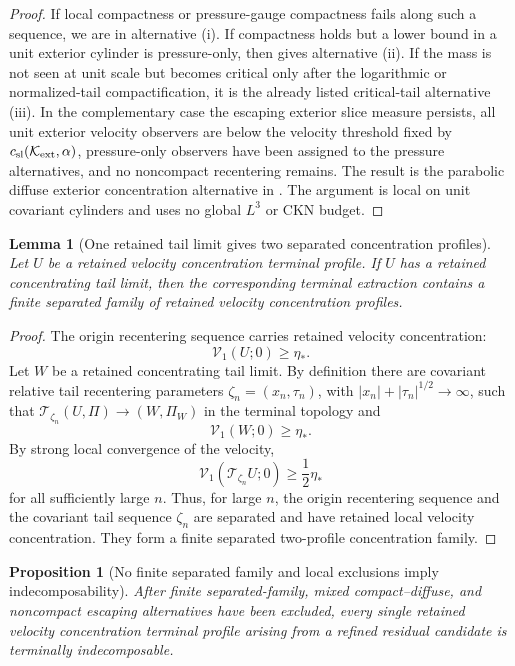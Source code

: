 \documentclass[11pt]{amsart}
\numberwithin{equation}{section}
\theoremstyle{plain}
\newtheorem{proposition}[proposition]{Proposition}
\newtheorem{lemma}[lemma]{Lemma}
\theoremstyle{definition}
\theoremstyle{remark}
\newcommand{\Vel}{\mathcal V}
\newcommand{\calK}{\mathcal K}
\begin{document}
\begin{proof}
If local compactness or pressure-gauge compactness fails along such a sequence,
we are in alternative \textup{(i)}.  If compactness holds but a lower bound in a
unit exterior cylinder is pressure-only, then
 gives alternative \textup{(ii)}.
If the mass is not seen at unit scale but becomes critical only after the
logarithmic or normalized-tail compactification, it is the already
listed critical-tail alternative \textup{(iii)}.  In the complementary case the
escaping exterior slice measure persists, all unit exterior velocity observers are
below the velocity threshold fixed by \(c_{\rm sl}(\calK_{\rm ext},\alpha)\), pressure-only
observers have been assigned to the pressure alternatives, and no noncompact
recentering remains.  The result is the
parabolic diffuse exterior concentration alternative in
.  The argument is local on unit covariant
cylinders and uses no global \(L^3\) or CKN budget.
\end{proof}

\begin{lemma}[One retained tail limit gives two separated concentration profiles]
\label{lem:descendant-to-separated-family}
Let \(U\) be a retained velocity concentration terminal profile.  If \(U\) has a
retained concentrating tail limit, then the corresponding terminal extraction contains a
finite separated family of retained velocity concentration profiles.
\end{lemma}

\begin{proof}
The origin recentering sequence carries retained velocity concentration:
\[
   \Vel_1(U;0)\ge\eta_*.
\]
Let \(W\) be a retained concentrating tail limit.  By definition there are
covariant relative tail recentering parameters
\(\zeta_n=(x_n,\tau_n)\), with
\(|x_n|+|\tau_n|^{1/2}\to\infty\), such that
\(\mathscr T_{\zeta_n}(U,\Pi)\to(W,\Pi_W)\) in the terminal topology and
\[
   \Vel_1(W;0)\ge\eta_*.
\]
By strong local convergence of the velocity,
\[
   \Vel_1(\mathscr T_{\zeta_n}U;0)
   \ge\frac12\eta_*
\]
for all sufficiently large \(n\).  Thus, for large \(n\), the origin
recentering sequence and the covariant tail sequence \(\zeta_n\) are separated
and have retained local velocity concentration.
They form a finite separated two-profile concentration family.
\end{proof}

\begin{proposition}[No finite separated family and local exclusions imply indecomposability]
\label{prop:no-multi-implies-atomic}
After finite separated-family, mixed compact--diffuse, and noncompact escaping
alternatives have been excluded, every single retained velocity concentration terminal
profile arising from a refined residual candidate is terminally indecomposable.
\end{proposition}
\end{document}

